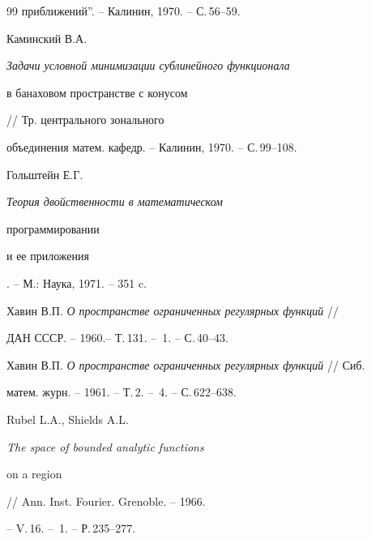 \begin{thebibliography}{99}
приближений''. -- Калинин, 1970. -- С.\,56--59. 




Каминский В.А. {\em Задачи условной минимизации сублинейного функционала 


в банаховом пространстве с конусом} // Тр. центрального зонального 


объединения матем. кафедр. -- Калинин, 1970. -- С.\,99--108. 




Гольштейн Е.Г. {\em Теория двойственности в математическом 


программировании 


и ее приложения}. -- М.: Наука, 1971. -- 351 c. 




Хавин В.П. {\em О пространстве ограниченных регулярных функций} //


ДАН СССР. -- 1960.-- Т.\,131. -- \No\,1. -- С.\,40--43. 




Хавин В.П. {\em О пространстве ограниченных регулярных функций} // Сиб. 


матем. журн. -- 1961. -- Т.\,2. -- \No\,4. -- С.\,622--638. 




Rubel L.A., Shields A.L. {\em The space of bounded analytic functions 


on a region} // Ann. Inst. Fourier. Grenoble. -- 1966. 


-- V.\,16. -- \No\,1. -- Р.\,235--277. 


 


\end{thebibliography} 


 


\vskip 1cm 


 






 


\label{end} 


 





